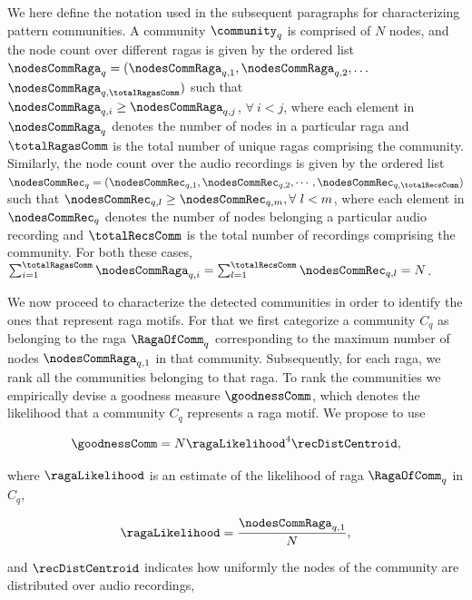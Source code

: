 {We here define the notation used in the subsequent paragraphs for characterizing pattern communities. A community $\community_q$ is comprised of $N$ nodes, and the node count over different \glspl{raga} is given by the ordered list ${\boldsymbol{\nodesCommRaga}_q} = (\nodesCommRaga_{q,1}, \nodesCommRaga_{q,2},\dots$ $\nodesCommRaga_{q,\totalRagasComm})$ such that $\nodesCommRaga_{q,i} \geq \nodesCommRaga_{q,j}$, $\forall~ i < j$,
where each element in $\nodesCommRaga_{q}$ denotes the number of nodes in a particular \gls{raga} and $\totalRagasComm$ is the total number of unique \glspl{raga} comprising the community. Similarly, the node count over the audio recordings is given by the ordered list ${\boldsymbol{\nodesCommRec}_q} = (\nodesCommRec_{q,1}, \nodesCommRec_{q,2},\cdots,\nodesCommRec_{q,\totalRecsComm})$ such that $\nodesCommRec_{q,l} \geq \nodesCommRec_{q,m}, \forall~l < m$,  where each element in $\nodesCommRec_{q}$ denotes the number of nodes belonging a particular audio recording and $\totalRecsComm$ is the total number of recordings comprising the community. For both these cases, $\sum_{i=1}^{\totalRagasComm}\nodesCommRaga_{q,i} = \sum_{l=1}^{\totalRecsComm}\nodesCommRec_{q,l} = N$.

We now proceed to characterize the detected communities in order to identify the ones that represent \gls{raga} motifs. For that we first categorize a community $C_q$ as belonging to the \gls{raga} $\RagaOfComm_q$ corresponding to the maximum number of nodes $\nodesCommRaga_{q,1}$ in that community. Subsequently, for each \gls{raga}, we rank all the communities belonging to that \gls{raga}. To rank the communities we empirically devise a goodness measure $\goodnessComm$, which denotes the likelihood that a community $C_q$ represents a \gls{raga} motif. We propose to use

\begin{equation}
\goodnessComm = N \ragaLikelihood^4 \recDistCentroid,
\label{eq:gamma_pattern_characterization}
\end{equation}

where $\ragaLikelihood$ is an estimate of the likelihood of \gls{raga} $\RagaOfComm_q$ in $C_q$, 

\begin{equation}
\ragaLikelihood = \frac{\nodesCommRaga_{q,1}}{N},
\end{equation}

and $\recDistCentroid$ indicates how uniformly the nodes of the community are distributed over audio recordings,

}
